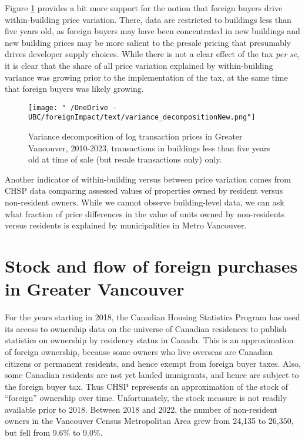 \documentclass[12pt]{article}
\begin{document}
Figure \ref{fig:varianceDecompositionNew} provides a bit more support for the
notion that foreign buyers drive within-building price variation. There, data
are restricted to buildings less than five years old, as foreign buyers may
have been concentrated in new buildings and new building prices may be more
salient to the presale pricing that presumably drives developer supply choices.
While there is not a clear effect of the tax \emph{per se}, it is clear that
the share of all price variation explained by within-building variance was
growing prior to the implementation of the tax, at the same time that foreign
buyers was likely growing.

\begin{figure}
\caption{\label{fig:varianceDecompositionNew} Variance decomposition of log transaction prices in Greater Vancouver, 2010-2023, transactions in buildings less than five years old at time of sale (but resale transactions only) only.}
\texttt{[image: "~/OneDrive - UBC/foreignImpact/text/variance\_decompositionNew.png"]}
\end{figure}

Another indicator of within-building versus between price variation comes from
CHSP data comparing assessed values of properties owned by resident versus
non-resident owners. While we cannot observe building-level data, we can ask
what fraction of price differences in the value of units owned by non-residents
versus residents is explained by municipalities in Metro Vancouver.

\section{Stock and flow of foreign purchases in Greater Vancouver}

For the years starting in 2018, the Canadian Housing Statistics Program has used its access to ownership data on the universe of Canadian residences to publish statistics on ownership by residency status in Canada. This is an approximation of foreign ownership, because some owners who live overseas are Canadian citizens or permanent residents, and hence exempt from foreign buyer taxes. Also, some Canadian residents are not yet landed immigrants, and hence are subject to the foreign buyer tax. Thus CHSP represents an approximation of the stock of ``foreign'' ownership over time. Unfortunately, the stock measure is not readily available prior to 2018. Between 2018 and 2022, the number of non-resident owners in the Vancouver Census Metropolitan Area grew from 24,135 to 26,350, but fell from 9.6\% to 9.0\%.
\end{document}
